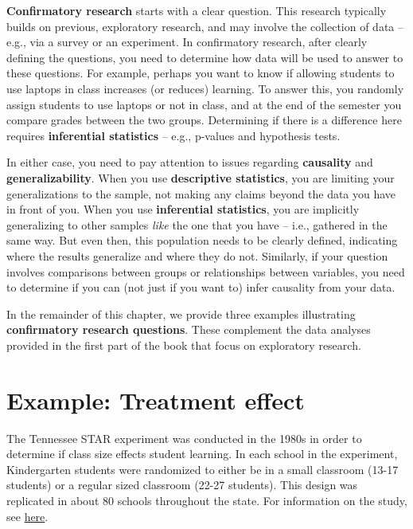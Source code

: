 \documentclass[
  letterpaper,
  DIV=11,
  numbers=noendperiod]{scrreprt}
\theoremstyle{definition}
\theoremstyle{remark}
\begin{document}
\textbf{Confirmatory research} starts with a clear question. This
research typically builds on previous, exploratory research, and may
involve the collection of data -- e.g., via a survey or an experiment.
In confirmatory research, after clearly defining the questions, you need
to determine how data will be used to answer to these questions. For
example, perhaps you want to know if allowing students to use laptops in
class increases (or reduces) learning. To answer this, you randomly
assign students to use laptops or not in class, and at the end of the
semester you compare grades between the two groups. Determining if there
is a difference here requires \textbf{inferential statistics} -- e.g.,
p-values and hypothesis tests.

In either case, you need to pay attention to issues regarding
\textbf{causality} and \textbf{generalizability}. When you use
\textbf{descriptive statistics}, you are limiting your generalizations
to the sample, not making any claims beyond the data you have in front
of you. When you use \textbf{inferential statistics}, you are implicitly
generalizing to other samples \emph{like} the one that you have -- i.e.,
gathered in the same way. But even then, this population needs to be
clearly defined, indicating where the results generalize and where they
do not. Similarly, if your question involves comparisons between groups
or relationships between variables, you need to determine if you can
(not just if you want to) infer causality from your data.

In the remainder of this chapter, we provide three examples illustrating
\textbf{confirmatory research questions}. These complement the data
analyses provided in the first part of the book that focus on
exploratory research.

\hypertarget{sec-example-TE}{%
\section{Example: Treatment effect}\label{sec-example-TE}}

The Tennessee STAR experiment was conducted in the 1980s in order to
determine if class size effects student learning. In each school in the
experiment, Kindergarten students were randomized to either be in a
small classroom (13-17 students) or a regular sized classroom (22-27
students). This design was replicated in about 80 schools throughout the
state. For information on the study, see
\href{https://en.wikipedia.org/wiki/Class-size_reduction}{here}.
\end{document}
